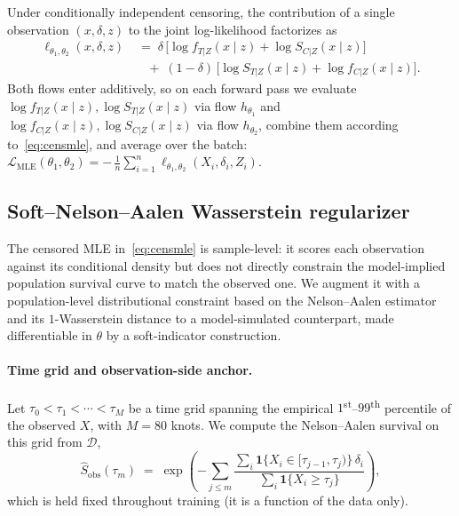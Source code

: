 Under conditionally independent censoring, the contribution of a single
observation $(x, \delta, z)$ to the joint log-likelihood factorizes as
\begin{align}
    \ell_{\theta_1, \theta_2}(x, \delta, z)
    &\;=\;
    \delta \,\Big[\log f_{T|Z}(x \mid z) + \log S_{C|Z}(x \mid z)\Big]
    \nonumber\\
    &\quad
    +\;
    (1 - \delta)\,\Big[\log S_{T|Z}(x \mid z) + \log f_{C|Z}(x \mid z)\Big].
    \label{eq:censmle}
\end{align}
Both flows enter additively, so on each forward pass we evaluate
$\log f_{T|Z}(x \mid z), \log S_{T|Z}(x \mid z)$ via flow $h_{\theta_1}$ and
$\log f_{C|Z}(x \mid z), \log S_{C|Z}(x \mid z)$ via flow $h_{\theta_2}$,
combine them according to~\eqref{eq:censmle}, and average over the batch:
\(
    \mathcal{L}_{\text{MLE}}(\theta_1, \theta_2)
    = -\,\frac{1}{n} \sum_{i=1}^{n} \ell_{\theta_1, \theta_2}(X_i, \delta_i, Z_i).
\)

\subsection{Soft--Nelson--Aalen Wasserstein regularizer}
\label{sec:reg}

The censored MLE in~\eqref{eq:censmle} is sample-level: it scores each
observation against its conditional density but does not directly constrain
the model-implied population survival curve to match the observed one. We
augment it with a population-level distributional constraint based on the
Nelson--Aalen estimator and its $1$-Wasserstein distance to a model-simulated
counterpart, made differentiable in $\theta$ by a soft-indicator
construction.

\paragraph{Time grid and observation-side anchor.}
Let $\tau_0 < \tau_1 < \cdots < \tau_M$ be a time grid spanning the empirical
$1$\textsuperscript{st}--$99$\textsuperscript{th} percentile of the observed
$X$, with $M = 80$ knots. We compute the Nelson--Aalen survival on this grid
from $\mathcal{D}$,
\[
    \widehat{S}_{\text{obs}}(\tau_m)
    \;=\;
    \exp\!\left(
        -\sum_{j \le m}
        \frac{
            \sum_{i} \mathbf{1}\{X_i \in [\tau_{j-1}, \tau_j)\}\, \delta_i
        }{
            \sum_{i} \mathbf{1}\{X_i \ge \tau_j\}
        }
    \right),
\]
which is held fixed throughout training (it is a function of the data only).

